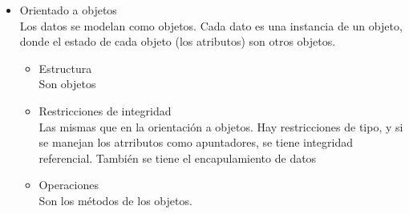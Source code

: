 \documentclass[10pt]{article}
\begin{document}
\begin{enumerate}[label=\alph*.]
{\begin{itemize}
{                De red \\
                Dados los problemas del modelo jerárquico, se creó el modelo de 
                redes. En lugar de tener una estructura de árbol, se tiene una 
                una estructura más general de gráfica. Esto da más flexibilidad 
                en cuanto a las relaciones posibles.
                \begin{itemize}
                    \item {Estructura \\
                    Es una estructura de gráfica. Cada nodo puede tener varios 
                    padres e hijos}
                    \item {Restricciones de integridad \\
                    Igualmente que en el modelo jerárquico, se pueden definir los 
                    tipos de nodo. 
                    }
                    \item{Operaciones \\
                    Las mismas operaciones que en una gráfica. Aunque se puede
                    definir relaciones de muchos a muchos, y por lo tanto se 
                    pueden dar restricciones de integridad referencial, acceder a
                    un datos sigue requiriendo un recorrido de la gráfica, lo 
                    que dificulta mantener la integridad de unicidad.
                    }
                \end{itemize} 
                }
                \item {Orientado a objetos\\
                Los datos se modelan como objetos. Cada dato es una instancia 
                de un objeto, donde el estado de cada objeto (los atributos) 
                son otros objetos.
                    
                \begin{itemize}
                    \item {Estructura\\
                    Son objetos}
                    \item {Restricciones de integridad \\
                    Las mismas que en la orientación a objetos. Hay 
                    restricciones de tipo, y si se manejan los atrributos 
                    como apuntadores, se tiene integridad referencial.
                    También se tiene el encapulamiento de datos}
                    \item{Operaciones \\
                    Son los métodos de los objetos.\\
                    }
                \end{itemize}
                }
            \end{itemize}
        }
    

\end{enumerate}
\end{document}
